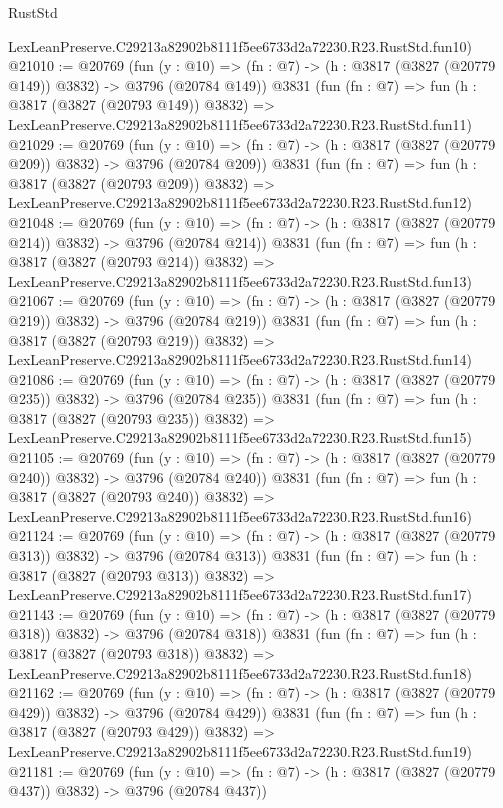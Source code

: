\begin{lexlean}{RustStd}
\begin{coremodule}
    LexLeanPreserve.C29213a82902b8111f5ee6733d2a72230.R23.RustStd.fun10)
@21010 := @20769
    (fun (y : @10) => (fn : @7) -> (h : @3817 (@3827 (@20779 @149)) @3832) -> @3796 (@20784 @149))
    @3831
    (fun (fn : @7) =>
    fun (h : @3817 (@3827 (@20793 @149)) @3832) =>
    LexLeanPreserve.C29213a82902b8111f5ee6733d2a72230.R23.RustStd.fun11)
@21029 := @20769
    (fun (y : @10) => (fn : @7) -> (h : @3817 (@3827 (@20779 @209)) @3832) -> @3796 (@20784 @209))
    @3831
    (fun (fn : @7) =>
    fun (h : @3817 (@3827 (@20793 @209)) @3832) =>
    LexLeanPreserve.C29213a82902b8111f5ee6733d2a72230.R23.RustStd.fun12)
@21048 := @20769
    (fun (y : @10) => (fn : @7) -> (h : @3817 (@3827 (@20779 @214)) @3832) -> @3796 (@20784 @214))
    @3831
    (fun (fn : @7) =>
    fun (h : @3817 (@3827 (@20793 @214)) @3832) =>
    LexLeanPreserve.C29213a82902b8111f5ee6733d2a72230.R23.RustStd.fun13)
@21067 := @20769
    (fun (y : @10) => (fn : @7) -> (h : @3817 (@3827 (@20779 @219)) @3832) -> @3796 (@20784 @219))
    @3831
    (fun (fn : @7) =>
    fun (h : @3817 (@3827 (@20793 @219)) @3832) =>
    LexLeanPreserve.C29213a82902b8111f5ee6733d2a72230.R23.RustStd.fun14)
@21086 := @20769
    (fun (y : @10) => (fn : @7) -> (h : @3817 (@3827 (@20779 @235)) @3832) -> @3796 (@20784 @235))
    @3831
    (fun (fn : @7) =>
    fun (h : @3817 (@3827 (@20793 @235)) @3832) =>
    LexLeanPreserve.C29213a82902b8111f5ee6733d2a72230.R23.RustStd.fun15)
@21105 := @20769
    (fun (y : @10) => (fn : @7) -> (h : @3817 (@3827 (@20779 @240)) @3832) -> @3796 (@20784 @240))
    @3831
    (fun (fn : @7) =>
    fun (h : @3817 (@3827 (@20793 @240)) @3832) =>
    LexLeanPreserve.C29213a82902b8111f5ee6733d2a72230.R23.RustStd.fun16)
@21124 := @20769
    (fun (y : @10) => (fn : @7) -> (h : @3817 (@3827 (@20779 @313)) @3832) -> @3796 (@20784 @313))
    @3831
    (fun (fn : @7) =>
    fun (h : @3817 (@3827 (@20793 @313)) @3832) =>
    LexLeanPreserve.C29213a82902b8111f5ee6733d2a72230.R23.RustStd.fun17)
@21143 := @20769
    (fun (y : @10) => (fn : @7) -> (h : @3817 (@3827 (@20779 @318)) @3832) -> @3796 (@20784 @318))
    @3831
    (fun (fn : @7) =>
    fun (h : @3817 (@3827 (@20793 @318)) @3832) =>
    LexLeanPreserve.C29213a82902b8111f5ee6733d2a72230.R23.RustStd.fun18)
@21162 := @20769
    (fun (y : @10) => (fn : @7) -> (h : @3817 (@3827 (@20779 @429)) @3832) -> @3796 (@20784 @429))
    @3831
    (fun (fn : @7) =>
    fun (h : @3817 (@3827 (@20793 @429)) @3832) =>
    LexLeanPreserve.C29213a82902b8111f5ee6733d2a72230.R23.RustStd.fun19)
@21181 := @20769
    (fun (y : @10) => (fn : @7) -> (h : @3817 (@3827 (@20779 @437)) @3832) -> @3796 (@20784 @437))

\end{coremodule}
\end{lexlean}
